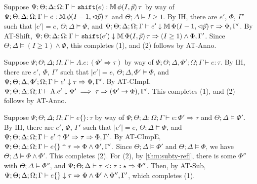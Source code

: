   \item[(T-Shift)] Suppose $\Psi ; \Theta ; \Delta ; \Omega ; \Gamma \vdash \texttt{shift}(e) : \mathbb{M} \, \phi(I,\vec{p}) \, \tau$ by way of
  $\Psi ; \Theta ; \Delta ; \Omega ; \Gamma \vdash e : \mathbb{M} \, \phi(I - 1,\lhd \vec{p}) \, \tau$ and
  $\Theta ; \Delta \vDash I \geq 1$.
  By IH, there are $e'$, $\Phi$, $\Gamma'$ such that
  $|e'| = e$,
  $\Theta ; \Delta \vDash \Phi$, and
  $\Psi  ; \Theta ; \Delta ; \Omega; \Gamma \vdash e' \downarrow \mathbb{M} \, \Phi(I-1,\lhd \vec{p}) \, \tau \Rightarrow \Phi,\Gamma'$.
  By AT-Shift,
  $\Psi  ; \Theta ; \Delta ; \Omega; \Gamma \vdash \texttt{shift}(e') \downarrow \mathbb{M} \, \Phi(I,\vec{p}) \, \tau \Rightarrow (I \geq 1) \wedge \Phi,\Gamma'$.
  Since $\Theta ; \Delta \vDash (I \geq 1) \wedge \Phi$, this completes (1), and (2) follows by AT-Anno.

  \item[(T-CImpI)] Suppose
  $\Psi ; \Theta ; \Delta ; \Omega ; \Gamma \vdash \Lambda .e : (\Phi' \Rightarrow \tau)$ by way of
  $\Psi ; \Theta ; \Delta,\Phi' ; \Omega ; \Gamma \vdash e : \tau$.
  By IH, there are $e'$, $\Phi$, $\Gamma'$ such that
  $|e'| = e$,
  $\Theta ; \Delta,\Phi' \vDash \Phi$, and
  $\Psi ; \Theta ; \Delta,\Phi'; \Omega ; \Gamma \vdash e' \downarrow \tau \Rightarrow \Phi,\Gamma'$.
  By AT-CImpI,
  $\Psi ; \Theta ; \Delta ; \Omega ; \Gamma \vdash \Lambda. e' \downarrow \Phi' \implies \tau \Rightarrow (\Phi' \to \Phi),\Gamma'$.
  This completes (1), and (2) follows by AT-Anno.
  
  \item[(T-CImpE)] Suppose
  $\Psi ; \Theta ; \Delta ; \Omega ; \Gamma \vdash e \{\} : \tau$ by way of
  $\Psi ; \Theta ; \Delta ; \Omega ; \Gamma \vdash e : \Phi' \Rightarrow \tau$ and
  $\Theta ; \Delta \vDash \Phi'$.
  By IH, there are $e'$, $\Phi$, $\Gamma'$ such that
  $|e'| = e$,
  $\Theta ; \Delta \vDash \Phi$, and
  $\Psi ; \Theta ; \Delta ; \Omega ; \Gamma \vdash e' \uparrow \Phi' \Rightarrow \tau \Rightarrow \Phi,\Gamma'$.
  By AT-CImpE,
  $\Psi ; \Theta ; \Delta ; \Omega ; \Gamma \vdash e \{\} \uparrow \tau \Rightarrow \Phi \wedge \Phi',\Gamma'$.
  Since $\Theta ; \Delta \vDash \Phi'$ and $\Theta ; \Delta \vDash \Phi$, we have $\Theta ; \Delta \vDash \Phi \wedge \Phi'$.
  This completes (2). For (2),
  by \autoref{thm:subty-refl}, there is some $\Phi''$ with
  $\Theta ; \Delta \vDash \Phi''$, and
  $\Psi ; \Theta ; \Delta \vdash \tau <: \tau : \star \Rightarrow \Phi''$.
  Then, by AT-Sub,
  $\Psi ; \Theta ; \Delta ; \Omega ; \Gamma \vdash e \{\} \downarrow \tau \Rightarrow \Phi \wedge \Phi' \wedge \Phi'',\Gamma'$,
  which completes (1).
  
